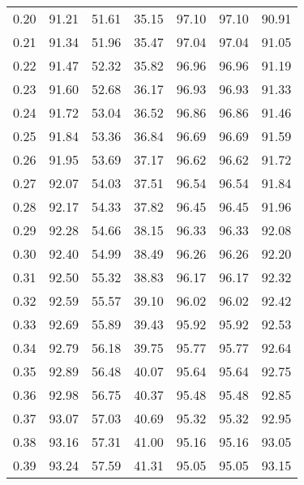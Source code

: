 \begin{tabular}{|c|c|c|c|c|c|c|}
      0.20 &     91.21 &     51.61 &      35.15 &   97.10 &      97.10 &         90.91 \\
      0.21 &     91.34 &     51.96 &      35.47 &   97.04 &      97.04 &         91.05 \\
      0.22 &     91.47 &     52.32 &      35.82 &   96.96 &      96.96 &         91.19 \\
      0.23 &     91.60 &     52.68 &      36.17 &   96.93 &      96.93 &         91.33 \\
      0.24 &     91.72 &     53.04 &      36.52 &   96.86 &      96.86 &         91.46 \\
      0.25 &     91.84 &     53.36 &      36.84 &   96.69 &      96.69 &         91.59 \\
      0.26 &     91.95 &     53.69 &      37.17 &   96.62 &      96.62 &         91.72 \\
      0.27 &     92.07 &     54.03 &      37.51 &   96.54 &      96.54 &         91.84 \\
      0.28 &     92.17 &     54.33 &      37.82 &   96.45 &      96.45 &         91.96 \\
      0.29 &     92.28 &     54.66 &      38.15 &   96.33 &      96.33 &         92.08 \\
      0.30 &     92.40 &     54.99 &      38.49 &   96.26 &      96.26 &         92.20 \\
      0.31 &     92.50 &     55.32 &      38.83 &   96.17 &      96.17 &         92.32 \\
      0.32 &     92.59 &     55.57 &      39.10 &   96.02 &      96.02 &         92.42 \\
      0.33 &     92.69 &     55.89 &      39.43 &   95.92 &      95.92 &         92.53 \\
      0.34 &     92.79 &     56.18 &      39.75 &   95.77 &      95.77 &         92.64 \\
      0.35 &     92.89 &     56.48 &      40.07 &   95.64 &      95.64 &         92.75 \\
      0.36 &     92.98 &     56.75 &      40.37 &   95.48 &      95.48 &         92.85 \\
      0.37 &     93.07 &     57.03 &      40.69 &   95.32 &      95.32 &         92.95 \\
      0.38 &     93.16 &     57.31 &      41.00 &   95.16 &      95.16 &         93.05 \\
      0.39 &     93.24 &     57.59 &      41.31 &   95.05 &      95.05 &         93.15 \\

\end{tabular}
